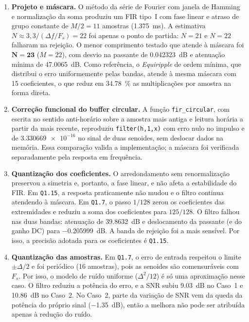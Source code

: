 \documentclass[11pt,a4paper]{article}
\begin{document}
\begin{enumerate}[label=\textbf{(\roman*)}, leftmargin=2.2em, itemsep=5pt]
    \item \textbf{Projeto e máscara.} O método da série de Fourier com janela de Hamming e normalização da soma produziu um FIR tipo~I com fase linear e atraso de grupo constante de $M/2 = 11$ amostras (\SI{1,375}{ms}). A estimativa $N \approx 3,3/(\Delta f/F_s) = 22$ foi apenas o ponto de partida: $N = 21$ e $N = 22$ falharam na rejeição. O menor comprimento testado que atende à máscara foi $\mathbf{N = 23}$ ($M = 22$), com desvio na passante de \SI{0,042323}{dB} e atenuação mínima de \SI{47,0065}{dB}. Como referência, o \textit{Equiripple} de ordem mínima, que distribui o erro uniformemente pelas bandas, atende à mesma máscara com 15 coeficientes, o que reduz em \SI{34,78}{\percent} as multiplicações por amostra na forma direta.

    \item \textbf{Correção funcional do buffer circular.} A função \texttt{fir\_circular}, com escrita no sentido anti-horário sobre a amostra mais antiga e leitura horária a partir da mais recente, reproduziu \texttt{filter(h,1,x)} com erro nulo no impulso e de $\num{3,330669e-16}$ no sinal de duas senoides, sem deslocar dados na memória. Essa comparação valida a implementação; a máscara foi verificada separadamente pela resposta em frequência.

    \item \textbf{Quantização dos coeficientes.} O arredondamento sem renormalização preservou a simetria e, portanto, a fase linear, e não afeta a estabilidade do FIR. Em \texttt{Q1.15}, a resposta praticamente não mudou e o filtro continua atendendo à máscara. Em \texttt{Q1.7}, o passo $1/128$ zerou os coeficientes das extremidades e reduziu a soma dos coeficientes para $125/128$. O filtro falhou nas duas bandas: atenuação de \SI{39,8632}{dB} e deslocamento da passante (e do ganho DC) para \SI{-0,205999}{dB}. A banda de rejeição foi a mais sensível. Por isso, a precisão adotada para os coeficientes é \texttt{Q1.15}.

    \item \textbf{Quantização das amostras.} Em \texttt{Q1.7}, o erro de entrada respeitou o limite $\pm\Delta/2$ e foi periódico (16 amostras), pois as senoides são comensuráveis com $F_s$. Por isso, o modelo de ruído uniforme ($\Delta^2/12$) é só uma aproximação nesse caso. O filtro reduziu a potência do erro, e a SNR subiu \SI{9,03}{dB} no Caso~1 e \SI{10,86}{dB} no Caso~2. No Caso~2, parte da variação de SNR vem da queda da potência do próprio sinal (\SI{-1,35}{dB}), então a melhora não pode ser atribuída apenas à redução do ruído.


\end{enumerate}
\end{document}
